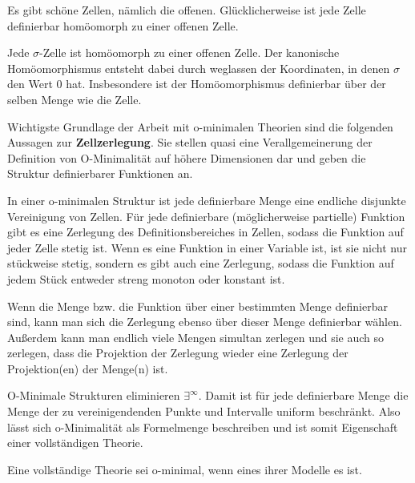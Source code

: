 Es gibt \glqq{}schöne\grqq{} Zellen, nämlich die offenen. Glücklicherweise ist jede Zelle definierbar homöomorph zu einer offenen Zelle.
\begin{lemma}
	Jede $\sigma$-Zelle ist homöomorph zu einer offenen Zelle. Der kanonische Homöomorphismus entsteht dabei durch weglassen der Koordinaten, in denen $\sigma$ den Wert 0 hat. Insbesondere ist der Homöomorphismus definierbar über der selben Menge wie die Zelle.
\end{lemma}

Wichtigste Grundlage der Arbeit mit o-minimalen Theorien sind die folgenden Aussagen zur \textbf{Zellzerlegung}. Sie stellen quasi eine Verallgemeinerung der Definition von O-Minimalität auf höhere Dimensionen dar und geben die Struktur definierbarer Funktionen an.
\begin{theorem}
	In einer o-minimalen Struktur ist jede definierbare Menge eine endliche disjunkte Vereinigung von Zellen. Für jede definierbare (möglicherweise partielle) Funktion gibt es eine Zerlegung des Definitionsbereiches in Zellen, sodass die Funktion auf jeder Zelle stetig ist. Wenn es eine Funktion in einer Variable ist, ist sie nicht nur stückweise stetig, sondern es gibt auch eine Zerlegung, sodass die Funktion auf jedem Stück entweder streng monoton oder konstant ist.
\end{theorem}
\begin{remark}
	Wenn die Menge bzw. die Funktion über einer bestimmten Menge definierbar sind, kann man sich die Zerlegung ebenso über dieser Menge definierbar wählen. Außerdem kann man endlich viele Mengen simultan zerlegen und sie auch so zerlegen, dass die Projektion der Zerlegung wieder eine Zerlegung der Projektion(en) der Menge(n) ist.
\end{remark}

\begin{corollary}
	O-Minimale Strukturen eliminieren $\exists^\infty$. Damit ist für jede definierbare Menge die Menge der zu vereinigendenden Punkte und Intervalle uniform beschränkt. Also lässt sich o-Minimalität als Formelmenge beschreiben und ist somit Eigenschaft einer vollständigen Theorie.
\end{corollary}

\begin{definition}
	Eine vollständige Theorie sei o-minimal, wenn eines ihrer Modelle es ist.
\end{definition}

